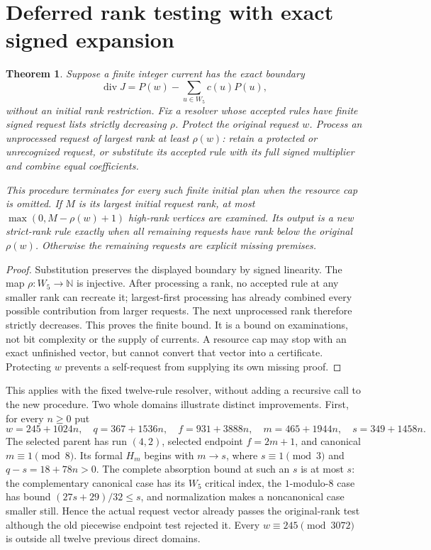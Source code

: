\documentclass[11pt]{article}
\newtheorem{theorem}{Theorem}
\begin{document}
\section{Deferred rank testing with exact signed expansion}
\begin{theorem}\label{thm:deferredrank}
Suppose a finite integer current has the exact boundary
\[
 \operatorname{div}J=P(w)-\sum_{u\in W_5}c(u)P(u),
\]
without an initial rank restriction. Fix a resolver whose accepted
rules have finite signed request lists strictly decreasing $\rho$.
Protect the original request $w$. Process an unprocessed request of
largest rank at least $\rho(w)$: retain a protected or unrecognized
request, or substitute its accepted rule with its full signed
multiplier and combine equal coefficients.

This procedure terminates for every such finite initial plan when
the resource cap is omitted. If $M$ is its largest initial request
rank, at most $\max(0,M-\rho(w)+1)$ high-rank vertices are examined.
Its output is a new strict-rank rule exactly when all remaining
requests have rank below the original $\rho(w)$. Otherwise the
remaining requests are explicit missing premises.
\end{theorem}
\begin{proof}
Substitution preserves the displayed boundary by signed linearity.
The map $\rho:W_5\to\mathbb N$ is injective. After processing a rank,
no accepted rule at any smaller rank can recreate it; largest-first
processing has already combined every possible contribution from
larger requests. The next unprocessed rank therefore strictly decreases.
This proves the finite bound. It is a bound on examinations, not bit
complexity or the supply of currents. A resource cap may stop with an
exact unfinished vector, but cannot convert that vector into a
certificate. Protecting $w$ prevents a self-request from supplying its
own missing proof.
\end{proof}

This applies with the fixed twelve-rule resolver, without adding a
recursive call to the new procedure. Two whole domains illustrate
distinct improvements.
First, for every $n\ge0$ put
\[
 w=245+1024n,\quad q=367+1536n,\quad
 f=931+3888n,\quad m=465+1944n,\quad s=349+1458n.
\]
The selected parent has run $(4,2)$, selected endpoint $f=2m+1$,
and canonical $m\equiv1\pmod8$. Its formal $H_m$ begins with
$m\to s$, where $s\equiv1\pmod3$ and $q-s=18+78n>0$.
The complete absorption bound at such an $s$ is at most $s$:
the complementary canonical case has its $W_5$ critical index,
the $1$-modulo-$8$ case has bound $(27s+29)/32\le s$, and
normalization makes a noncanonical case smaller still. Hence the
actual request vector already passes the original-rank test although
the old piecewise endpoint test rejected it. Every
$w\equiv245\pmod{3072}$ is outside all twelve previous direct domains.
\end{document}
